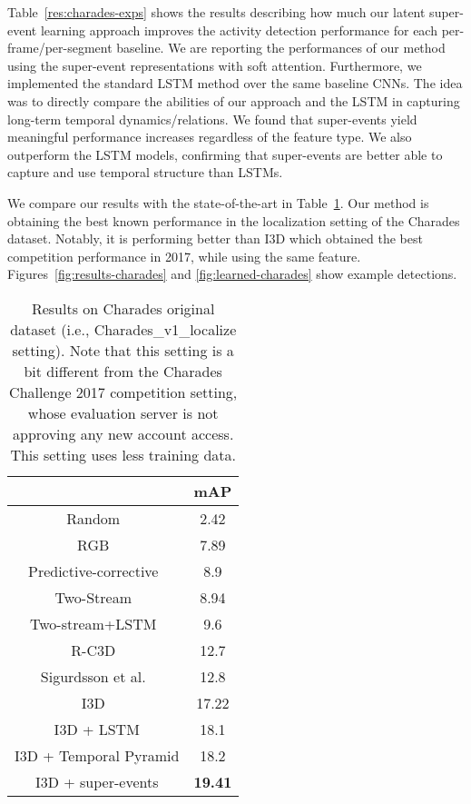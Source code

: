 \documentclass[10pt,twocolumn,letterpaper]{article}
\begin{document}
Table~\ref{res:charades-exps} shows the results describing how much our latent super-event learning approach improves the activity detection performance for each per-frame/per-segment baseline. We are reporting the performances of our method using the super-event representations with soft attention. Furthermore, we implemented the standard LSTM method over the same baseline CNNs. The idea was to directly compare the abilities of our approach and the LSTM in capturing long-term temporal dynamics/relations. We found that super-events yield meaningful performance increases regardless of the feature type. We also outperform the LSTM models, confirming that super-events are better able to capture and use temporal structure than LSTMs.

We compare our results with the state-of-the-art in Table~\ref{res:charades-comp}. Our method is obtaining the best known performance in the localization setting of the Charades dataset. Notably, it is performing better than I3D which obtained the best competition performance in 2017, while using the same feature. Figures~\ref{fig:results-charades} and \ref{fig:learned-charades} show example detections.




\begin{table}
\caption{Results on Charades original dataset (i.e., Charades\_v1\_localize setting). Note that this setting is a bit different from the Charades Challenge 2017 competition setting, whose evaluation server is not approving any new account access. This setting uses less training data.}
\label{res:charades-comp}
\centering
\setlength\extrarowheight{0pt}
\begin{tabular}{c|c}
\hline
 & mAP \\
\hline
Random~\cite{sigurdsson2016asynchronous} & 2.42 \\
RGB~\cite{sigurdsson2016asynchronous}    & 7.89 \\
Predictive-corrective~\cite{dave2017predictive} & 8.9 \\
Two-Stream~\cite{sigurdsson2016asynchronous}& 8.94 \\
Two-stream+LSTM~\cite{sigurdsson2016asynchronous}& 9.6 \\
R-C3D~\cite{xu2017r}                     &  12.7 \\
Sigurdsson et al.~\cite{sigurdsson2016asynchronous} & 12.8 \\
I3D~\cite{carreira2017quo}                & 17.22 \\
I3D + LSTM                               & 18.1 \\
I3D + Temporal Pyramid                    & 18.2 \\
I3D + super-events                       & \bf{19.41} \\
\hline
\end{tabular}
\end{table}
\end{document}
